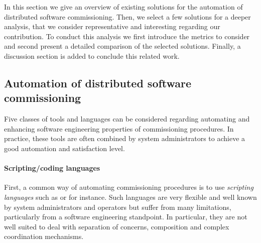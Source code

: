 


In this section we give an overview of existing solutions for the automation of distributed software commissioning. Then, we select a few solutions for a deeper analysis, that we consider representative and interesting regarding our contribution. To conduct this analysis we first introduce the metrics to consider and second present a detailed comparison of the selected solutions. Finally, a discussion section is added to conclude this related work.

\subsection{Automation of distributed software commissioning}
\label{sec:rwclasses}

Five classes of tools and languages can be considered regarding automating and enhancing software engineering properties of commissioning procedures. In practice, these tools are often combined by system administrators to achieve a good automation and satisfaction level. 

\paragraph{Scripting/coding languages}
First, a common way of automating commissioning procedures is to use
\emph{scripting languages} such as \shell or \ruby for instance. Such
languages are very flexible and well known by system administrators
and operators but suffer from many limitations, particularly from a
software engineering standpoint. In particular, they are not well
suited to deal with separation of concerns, composition and complex
coordination mechanisms.

